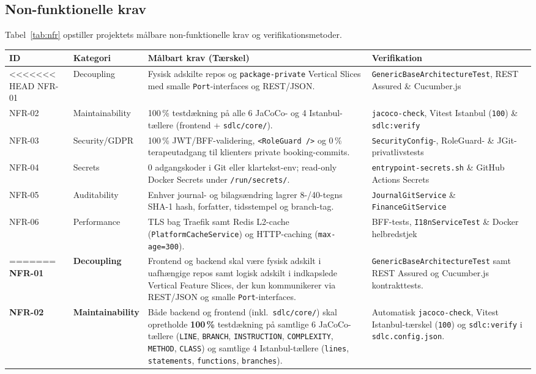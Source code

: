 \documentclass[11pt,a4paper]{article}
\begin{document}
\begin{table}[htbp]
\subsection{Non-funktionelle krav}
Tabel~\ref{tab:nfr} opstiller projektets målbare non-funktionelle krav og verifikationsmetoder.

\begin{table}[htbp]
\centering
\small
\begin{tabularx}{\textwidth}{P{1.4cm} P{2.6cm} Y P{3.8cm}}
\toprule
\textbf{ID} & \textbf{Kategori} & \textbf{Målbart krav (Tærskel)} & \textbf{Verifikation} \\
\midrule
<<<<<<< HEAD
NFR-01 & Decoupling & Fysisk adskilte repos og \texttt{package-private} Vertical Slices med smalle \texttt{Port}-interfaces og REST/JSON. & \texttt{GenericBase\allowbreak ArchitectureTest}, REST Assured \& Cucumber.js \\
NFR-02 & Maintainability & 100\,\% testdækning på alle 6 JaCoCo- og 4 Istanbul-tællere (frontend + \texttt{sdlc/core/}). & \texttt{jacoco-check}, Vitest Istanbul (\texttt{100}) \& \texttt{sdlc:verify} \\
NFR-03 & Security/GDPR & 100\,\% JWT/BFF-validering, \texttt{<RoleGuard />} og 0\,\% terapeutadgang til klienters private booking-commits. & \texttt{SecurityConfig}-, RoleGuard- \& JGit-privatlivstests \\
NFR-04 & Secrets & 0 adgangskoder i Git eller klartekst-env; read-only Docker Secrets under \texttt{/run/secrets/}. & \texttt{entrypoint-secrets.sh} \& GitHub Actions Secrets \\
NFR-05 & Auditability & Enhver journal- og bilagsændring lagrer 8-/40-tegns SHA-1 hash, forfatter, tidsstempel og branch-tag. & \texttt{JournalGitService} \& \texttt{FinanceGitService} \\
NFR-06 & Performance & TLS bag Traefik samt Redis L2-cache (\texttt{PlatformCacheService}) og HTTP-caching (\texttt{max-age=300}). & BFF-tests, \texttt{I18nServiceTest} \& Docker helbredstjek \\
=======
\textbf{NFR-01} & \textbf{Decoupling} & Frontend og backend skal være fysisk adskilt i uafhængige repos samt logisk adskilt i indkapslede Vertical Feature Slices, der kun kommunikerer via REST/JSON og smalle \texttt{Port}-interfaces. & \texttt{GenericBaseArchitectureTest} samt REST Assured og Cucumber.js kontrakttests. \\
\addlinespace
\textbf{NFR-02} & \textbf{Maintainability} & Både backend og frontend (inkl.\ \texttt{sdlc/core/}) skal opretholde \textbf{100\,\%} testdækning på samtlige 6 JaCoCo-tællere (\texttt{LINE}, \texttt{BRANCH}, \texttt{INSTRUCTION}, \texttt{COMPLEXITY}, \texttt{METHOD}, \texttt{CLASS}) og samtlige 4 Istanbul-tællere (\texttt{lines}, \texttt{statements}, \texttt{functions}, \texttt{branches}). & Automatisk \texttt{jacoco-check}, Vitest Istanbul-tærskel (\texttt{100}) og \texttt{sdlc:verify} i \texttt{sdlc.config.json}. \\

\end{tabularx}
\end{table}
\end{table}
\end{document}
